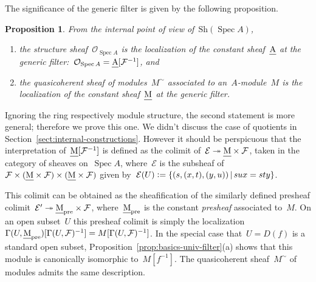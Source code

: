 \documentclass[10pt,reqno,a4paper]{amsbook}
\makeatletter
\theoremstyle{definition}
\theoremstyle{plain}
\newtheorem{prop}[defn]{Proposition}
\theoremstyle{remark}
\newcommand{\E}{\mathcal{E}}
\newcommand{\F}{\mathcal{F}}
\renewcommand{\O}{\mathcal{O}}
\let\oldul\ul
\renewcommand{\ul}[1]{\text{\oldul{$#1$}}}
\newcommand{\Sh}{\mathrm{Sh}}
\DeclareMathOperator{\Spec}{Spec}
\newcommand{\?}{\,{:}\,}
\renewcommand{\_}{\mathpunct{.}\,}
\newcommand{\defeq}{\vcentcolon=}
\renewenvironment{proof}[1][\proofname]{\par
  \pushQED{\qed}%
  \normalfont \topsep6\p@\@plus6\p@\relax
  \trivlist
  \item[\hskip\labelsep
        \itshape
    #1\@addpunct{.}]\ignorespaces
}{%
  \popQED\endtrivlist\@endpefalse
}
\makeatother
\begin{document}
The significance of the generic filter is given by the following proposition.
\begin{prop}\label{prop:tilde-construction-internally}
From the internal point of view of~$\Sh(\Spec A)$,
\begin{enumerate}
\item the structure
sheaf~$\O_{\Spec A}$ is the localization of the constant sheaf~$\ul{A}$ at the
generic filter:~$\O_{\Spec A} = \ul{A}[\F^{-1}]$, and
\item the quasicoherent sheaf of modules~$M^\sim$ associated to
an~$A$-module~$M$ is the localization of the constant sheaf~$\ul{M}$ at the
generic filter.
\end{enumerate}\end{prop}
\begin{proof}Ignoring the ring respectively module structure, the second
statement is more general; therefore we prove this one. We didn't discuss the
case of quotients in Section~\ref{sect:internal-constructions}. However it
should be perspicuous that the interpretation of~$\ul{M}[\F^{-1}]$ is defined
as the colimit of~$\E \twoheadrightarrow \ul{M} \times \F$, taken in the
category of sheaves on~$\Spec A$, where~$\E$ is the subsheaf of~$\F \times
(\ul{M} \times \F) \times (\ul{M} \times \F)$ given by~$\E(U) \defeq \{
(s,(x,t),(y,u)) \,|\, sux = sty \}$.

This colimit can be obtained as the sheafification of the similarly defined
presheaf colimit~$\E' \twoheadrightarrow \ul{M}_\mathrm{pre} \times \F$,
where~$\ul{M}_\mathrm{pre}$ is the constant \emph{presheaf} associated to~$M$.
On an open subset~$U$ this presheaf colimit is simply the
localization~$\Gamma(U, \ul{M}_\mathrm{pre})[\Gamma(U, \F)^{-1}] = M[\Gamma(U,
\F)^{-1}]$. In the special case that~$U = D(f)$ is a standard open subset,
Proposition~\ref{prop:basics-univ-filter}(a) shows that this module is
canonically isomorphic to~$M[f^{-1}]$. The quasicoherent sheaf~$M^\sim$ of
modules admits the same description.
\end{proof}
\end{document}
